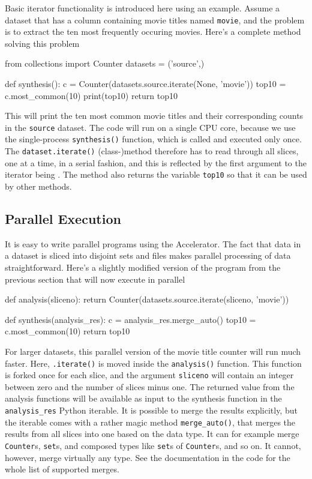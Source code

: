 Basic iterator functionality is introduced here using an example.
Assume a dataset that has a column containing movie titles named
\texttt{movie}, and the problem is to extract the ten most frequently
occuring movies.  Here's a complete method solving this problem
\begin{python}
from collections import Counter
datasets = ('source',)

def synthesis():
    c = Counter(datasets.source.iterate(None, 'movie'))
    top10 = c.most_common(10)
    print(top10)
    return top10
\end{python}
This will print the ten most common movie titles and their
corresponding counts in the \texttt{source} dataset.  The code will
run on a single CPU core, because we use the single-process
\texttt{synthesis()} function, which is called and executed only once.
The \texttt{dataset.iterate()} (class-)method therefore has to read
through all slices, one at a time, in a serial fashion, and this is
reflected by the first argument to the iterator being \pyNone.  The
method also returns the variable \texttt{top10} so that it can be used
by other methods.



\subsection{Parallel Execution}
It is easy to write parallel programs using the Accelerator.  The fact
that data in a dataset is sliced into disjoint sets and files makes
parallel processing of data straightforward.  Here's a slightly
modified version of the program from the previous section that will
now execute in parallel
\begin{python}
def analysis(sliceno):
    return Counter(datasets.source.iterate(sliceno, 'movie'))

def synthesis(analysis_res):
    c = analysis_res.merge_auto()
    top10 = c.most_common(10)
    return top10
\end{python}
For larger datasets, this parallel version of the movie title counter
will run much faster.  Here, \texttt{.iterate()} is moved inside the
\texttt{analysis()} function.  This function is forked once for each
slice, and the argument \texttt{sliceno} will contain an integer
between zero and the number of slices minus one.  The returned value
from the analysis functions will be available as input to the
synthesis function in the \texttt{analysis\_res} Python iterable.  It
is possible to merge the results explicitly, but the iterable
comes with a rather magic method \texttt{merge\_auto()}, that merges
the results from all slices into one based on the data type.  It can
for example merge \texttt{Counter}s, \texttt{set}s, and composed types
like \texttt{set}s of \texttt{Counter}s, and so on. It cannot, however,
merge virtually any type. See the documentation in the code for the whole
list of supported merges.


